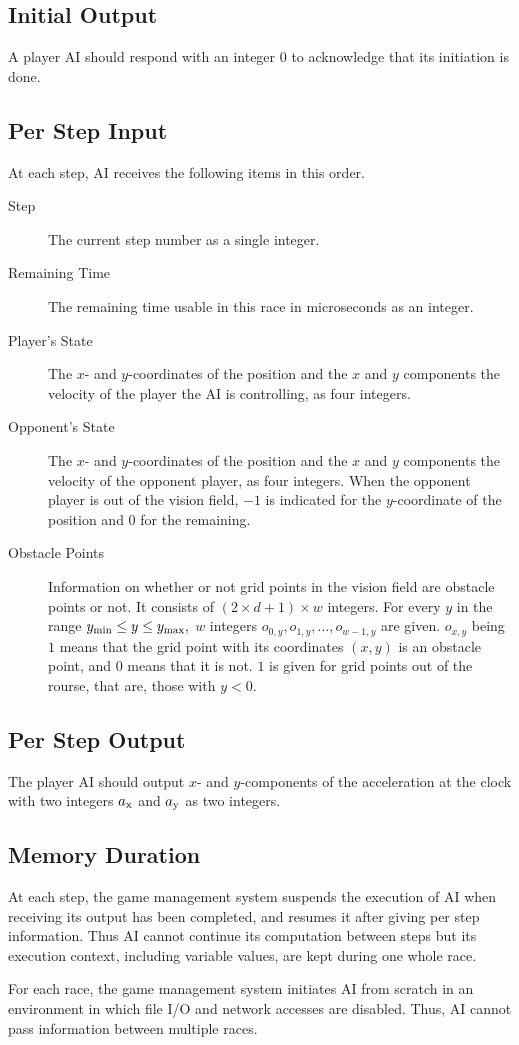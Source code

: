 \documentclass[11pt]{article}
\begin{document}
\subsection{Initial Output}
A player AI should respond with an integer $0$ to acknowledge that its
initiation is done.

\subsection{Per Step Input}
At each step, AI receives the following items in this order.
\begin{description}
\item[Step] The current step number as a single integer.
\item[Remaining Time] The remaining time usable in this race in
  microseconds as an integer.
\item[Player's State] The $x$- and $y$-coordinates of the position and
  the $x$ and $y$ components the velocity of the player the AI is
  controlling, as four integers.
\item[Opponent's State] The $x$- and $y$-coordinates of the position and
  the $x$ and $y$ components the velocity of the opponent player, as
  four integers.  When the opponent player is out of the vision field,
  $-1$ is indicated for the $y$-coordinate of the position and $0$ for
  the remaining.
\item[Obstacle Points] Information on whether or not grid points in
  the vision field are obstacle points or not.  It consists of
  $(2\times d+1)\times w$ integers.  For every $y$ in the range
  $y_{\rm min} \le y \le y_{\rm max},$ $w$ integers $o_{0,y}, o_{1,y},
  \ldots, o_{w-1,y}$ are given.  $o_{x,y}$ being $1$ means that the
  grid point with its coordinates $(x,y)$ is an obstacle point, and
  $0$ means that it is not.  $1$ is given for grid points out of the
  rourse, that are, those with $y<0$.

\end{description}

\subsection{Per Step Output}
The player AI should output $x$- and $y$-components of the
acceleration at the clock with two integers $a_{\rm x}$ and $a_{\rm
  y}$ as two integers.

\subsection{Memory Duration}
At each step, the game management system suspends the execution of AI
when receiving its output has been completed, and resumes it after
giving per step information.  Thus AI cannot continue its computation
between steps but its execution context, including variable values,
are kept during one whole race.

For each race, the game management system initiates AI from scratch in
an environment in which file I/O and network accesses are disabled.
Thus, AI cannot pass information between multiple races.
\end{document}
